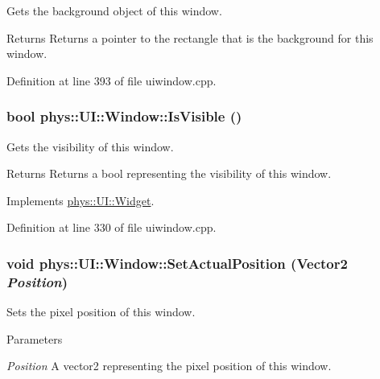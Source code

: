 Gets the background object of this window. 

\begin{DoxyReturn}{Returns}
Returns a pointer to the rectangle that is the background for this window. 
\end{DoxyReturn}


Definition at line 393 of file uiwindow.cpp.

\hypertarget{classphys_1_1UI_1_1Window_aa1d88c50c0965510b494b51f3e5a7bf0}{
\subsubsection[{IsVisible}]{\setlength{\rightskip}{0pt plus 5cm}bool phys::UI::Window::IsVisible ()}}
\label{d4/d86/classphys_1_1UI_1_1Window_aa1d88c50c0965510b494b51f3e5a7bf0}


Gets the visibility of this window. 

\begin{DoxyReturn}{Returns}
Returns a bool representing the visibility of this window. 
\end{DoxyReturn}


Implements \hyperlink{classphys_1_1UI_1_1Widget_aaf1a1bd31b8e626467ce9cdb69bdf7ac}{phys::UI::Widget}.



Definition at line 330 of file uiwindow.cpp.

\hypertarget{classphys_1_1UI_1_1Window_aeedbf986dca9556fd62980a6d7d27c79}{
\subsubsection[{SetActualPosition}]{\setlength{\rightskip}{0pt plus 5cm}void phys::UI::Window::SetActualPosition ({\bf Vector2} {\em Position})}}
\label{d4/d86/classphys_1_1UI_1_1Window_aeedbf986dca9556fd62980a6d7d27c79}


Sets the pixel position of this window. 


\begin{DoxyParams}{Parameters}
\item[{\em Position}]A vector2 representing the pixel position of this window. \end{DoxyParams}


